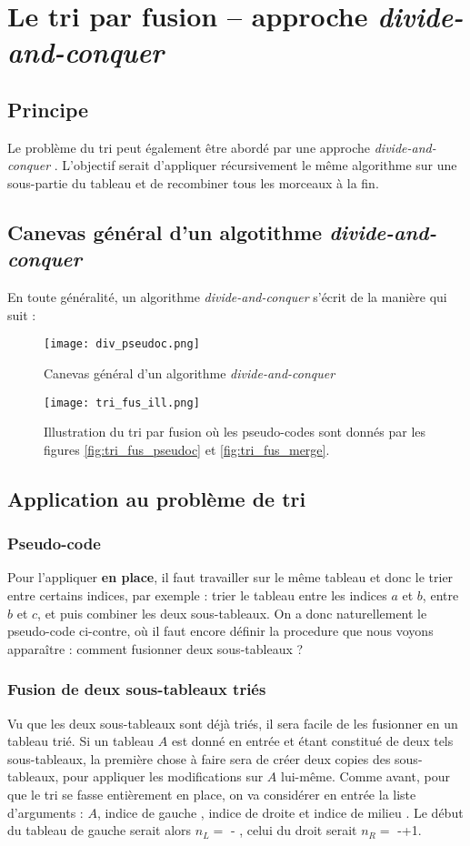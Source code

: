 \documentclass[12pt,a4paper]{book}
\newcommand{\divc}{\textit{divide-and-conquer} }
\begin{document}
\section{Le tri par fusion -- approche \divc}
\subsection{Principe}
Le problème du tri peut également être abordé par une approche \divc . L'objectif serait d'appliquer récursivement le même algorithme sur une sous-partie du tableau et de recombiner tous les morceaux à la fin.
\subsection{Canevas général d'un algotithme \divc}
En toute généralité, un algorithme \divc s'écrit de la manière qui suit :
\begin{figure}[h]
\centering
\texttt{[image: div\_pseudoc.png]}
\caption{Canevas général d'un algorithme \divc}
\end{figure}
\begin{figure}[h]
\centering
\texttt{[image: tri\_fus\_ill.png]}
\caption{Illustration du tri par fusion où les pseudo-codes sont donnés par les figures \ref{fig:tri_fus_pseudoc} et \ref{fig:tri_fus_merge}.}
\label{fig:tri_fus_ill}
\end{figure}
\subsection{Application au problème de tri}
\subsubsection{Pseudo-code}
Pour l'appliquer \textbf{en place}, il faut travailler sur le même tableau et donc le trier entre certains indices, par exemple : trier le tableau entre les indices $a$ et $b$, entre $b$ et $c$, et puis combiner les deux sous-tableaux. On a donc naturellement le pseudo-code ci-contre, où il faut encore définir la procedure  que nous voyons apparaître : comment fusionner deux sous-tableaux ?
\subsubsection{Fusion de deux sous-tableaux triés}
Vu que les deux sous-tableaux sont déjà triés, il sera facile de les fusionner en un tableau trié. Si un tableau $A$ est donné en entrée et étant constitué de deux tels sous-tableaux, la première chose à faire sera de créer deux copies des sous-tableaux, pour appliquer les modifications sur $A$ lui-même. Comme avant, pour que le tri se fasse entièrement en place, on va considérer en entrée la liste d'arguments : $A$, indice de gauche , indice de droite  et indice de milieu . Le début du tableau de gauche serait alors $n_L =$ - , celui du droit serait $n_R = $ -+1. \\
\end{document}
